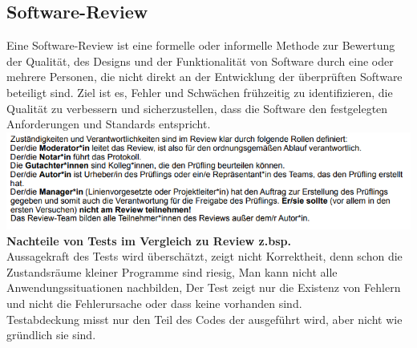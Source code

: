 \documentclass{article}
\begin{document}
\subsection*{Software-Review}

Eine Software-Review ist eine formelle oder informelle Methode zur Bewertung der Qualität, des Designs und der Funktionalität von Software durch eine oder mehrere Personen, die nicht direkt an der Entwicklung der überprüften Software beteiligt sind. Ziel ist es, Fehler und Schwächen frühzeitig zu identifizieren, die Qualität zu verbessern und sicherzustellen, dass die Software den festgelegten Anforderungen und Standards entspricht.
\includegraphics[scale=1.18]{media/Review.png}\\
\textbf{Nachteile von Tests im Vergleich zu Review z.bsp.}\\
Aussagekraft des Tests wird überschätzt, zeigt nicht Korrektheit, denn schon die Zustandsräume kleiner Programme sind riesig, Man kann nicht alle Anwendungssituationen nachbilden, Der Test zeigt nur die Existenz von Fehlern und nicht die Fehlerursache oder dass keine vorhanden sind.\\
Testabdeckung misst nur den Teil des Codes der ausgeführt wird, aber nicht wie gründlich sie sind.
\end{document}
